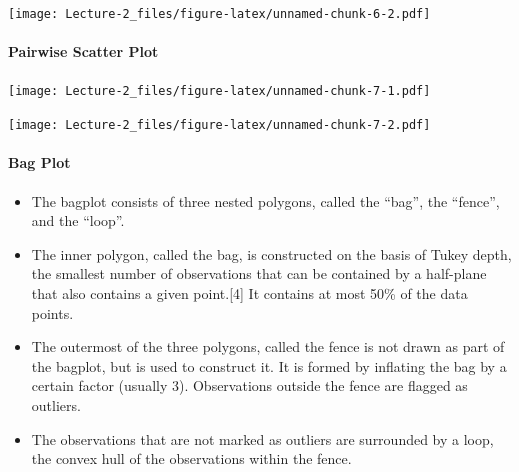 \documentclass[
]{article}
\newenvironment{Shaded}{\begin{snugshade}}{\end{snugshade}}
\newcommand{\DataTypeTok}[1]{\textcolor[rgb]{0.13,0.29,0.53}{#1}}
\newcommand{\DecValTok}[1]{\textcolor[rgb]{0.00,0.00,0.81}{#1}}
\newcommand{\KeywordTok}[1]{\textcolor[rgb]{0.13,0.29,0.53}{\textbf{#1}}}
\newcommand{\NormalTok}[1]{#1}
\newcommand{\OperatorTok}[1]{\textcolor[rgb]{0.81,0.36,0.00}{\textbf{#1}}}
\newcommand{\StringTok}[1]{\textcolor[rgb]{0.31,0.60,0.02}{#1}}
\begin{document}
\texttt{[image: Lecture-2\_files/figure-latex/unnamed-chunk-6-2.pdf]}

\hypertarget{pairwise-scatter-plot}{%
\paragraph{Pairwise Scatter Plot}\label{pairwise-scatter-plot}}

\begin{Shaded}
\end{Shaded}

\texttt{[image: Lecture-2\_files/figure-latex/unnamed-chunk-7-1.pdf]}

\begin{Shaded}
\end{Shaded}

\texttt{[image: Lecture-2\_files/figure-latex/unnamed-chunk-7-2.pdf]}

\hypertarget{bag-plot}{%
\paragraph{Bag Plot}\label{bag-plot}}

\begin{itemize}
\item
  The bagplot consists of three nested polygons, called the ``bag'', the
  ``fence'', and the ``loop''.
\item
  The inner polygon, called the bag, is constructed on the basis of
  Tukey depth, the smallest number of observations that can be contained
  by a half-plane that also contains a given point.{[}4{]} It contains
  at most 50\% of the data points.
\item
  The outermost of the three polygons, called the fence is not drawn as
  part of the bagplot, but is used to construct it. It is formed by
  inflating the bag by a certain factor (usually 3). Observations
  outside the fence are flagged as outliers.
\item
  The observations that are not marked as outliers are surrounded by a
  loop, the convex hull of the observations within the fence.
\end{itemize}
\end{document}
